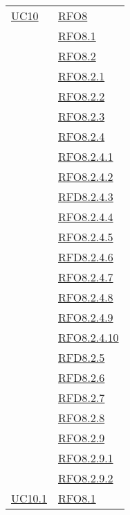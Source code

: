 \begin{longtable}{|>{\centering}m{5cm}|m{5cm}<{\centering}|}
\hyperlink{UC10}{UC10} 
& \hyperlink{RFO8}{RFO8}\\
& \hyperlink{RFO8.1}{RFO8.1}\\
& \hyperlink{RFO8.2}{RFO8.2}\\
& \hyperlink{RFO8.2.1}{RFO8.2.1}\\
& \hyperlink{RFO8.2.2}{RFO8.2.2}\\
& \hyperlink{RFO8.2.3}{RFO8.2.3}\\
& \hyperlink{RFO8.2.4}{RFO8.2.4}\\
& \hyperlink{RFO8.2.4.1}{RFO8.2.4.1}\\
& \hyperlink{RFO8.2.4.2}{RFO8.2.4.2}\\
& \hyperlink{RFD8.2.4.3}{RFD8.2.4.3}\\
& \hyperlink{RFO8.2.4.4}{RFO8.2.4.4}\\
& \hyperlink{RFO8.2.4.5}{RFO8.2.4.5}\\
& \hyperlink{RFD8.2.4.6}{RFD8.2.4.6}\\
& \hyperlink{RFO8.2.4.7}{RFO8.2.4.7}\\
& \hyperlink{RFO8.2.4.8}{RFO8.2.4.8}\\
& \hyperlink{RFO8.2.4.9}{RFO8.2.4.9}\\
& \hyperlink{RFO8.2.4.10}{RFO8.2.4.10}\\
& \hyperlink{RFD8.2.5}{RFD8.2.5}\\
& \hyperlink{RFD8.2.6}{RFD8.2.6}\\
& \hyperlink{RFD8.2.7}{RFD8.2.7}\\
& \hyperlink{RFO8.2.8}{RFO8.2.8}\\
& \hyperlink{RFO8.2.9}{RFO8.2.9}\\
& \hyperlink{RFO8.2.9.1}{RFO8.2.9.1}\\
& \hyperlink{RFO8.2.9.2}{RFO8.2.9.2}\\\hline

\hyperlink{UC10.1}{UC10.1} & \hyperlink{RFO8.1}{RFO8.1}\\\hline


\end{longtable}
